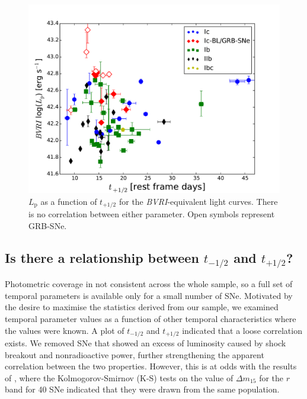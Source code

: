\documentclass[a4paper,fleqn,usenatbib]{mnras}
\begin{document}
\begin{figure}
\centering
\includegraphics[scale=0.4]{BVRI_luminosity_v_decay.pdf}
\caption{$L_{\mathrm{p}}$ as a function of $t_{+1/2}$ for the \textit{BVRI}-equivalent light curves. There is no correlation between either parameter. Open symbols represent GRB-SNe.}
\label{fig:Lpvdecay}
\end{figure}

\subsection{Is there a relationship between $t_{-1/2}$ and $t_{+1/2}$?}
Photometric coverage in not consistent across the whole sample, so a full set of temporal parameters is available only for a small number of SNe. Motivated by the desire to maximise the statistics derived from our sample, we examined temporal parameter values as a function of other temporal characteristics where the values were known. A plot of $t_{-1/2}$ and $t_{+1/2}$ indicated that a loose correlation exists. We removed SNe that showed an excess of luminosity caused by shock breakout and nonradioactive power, further strengthening the apparent correlation between the two properties. However, this is at odds with the results of \cite{Taddia2015}, where the Kolmogorov-Smirnov (K-S) tests on the value of $\Delta m_{15}$ for the $r$ band for 40 SNe indicated that they were drawn from the same population. 
\end{document}
